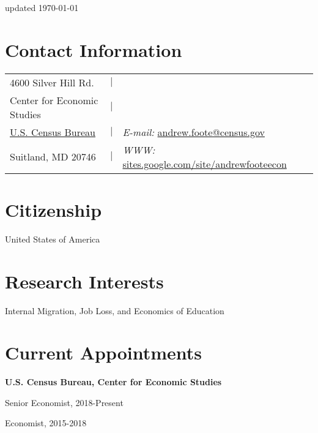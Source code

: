 \documentclass[margin,line]{res}
\newenvironment{list1}{
  \begin{list}{\ding{113}}{%
      \setlength{\itemsep}{0in}
      \setlength{\parsep}{0in} \setlength{\parskip}{0in}
      \setlength{\topsep}{0in} \setlength{\partopsep}{0in} 
      \setlength{\leftmargin}{0.17in}}}{\end{list}}
\begin{document}
{}

 \hfill updated \today{}

\begin{resume}
\section{\sc Contact Information}
\vspace{.02in}
\begin{tabular}{@{}p{2in}p{1.5in}p{4in}}
4600 Silver Hill Rd.             &\hfill $\vert$ &\\            
{Center for Economic Studies} &\hfill $\vert$   &\\    
\href{http://www.census.gov/}{U.S. Census Bureau} &\hfill $\vert$ & {\it E-mail:}  \href{mailto:andrew.foote@census.gov}{andrew.foote@census.gov}\\       
Suitland, MD 20746  &\hfill $\vert$& {\it WWW:} \href{http://sites.google.com/site/andrewfooteecon}{sites.google.com/site/andrewfooteecon} \\     
\end{tabular}

\section{\sc Citizenship} 

United States of America

\vspace{-.1in}
\section{\sc Research Interests}
Internal Migration, Job Loss, and Economics of Education

\section{\sc Current Appointments}

{\bf U.S. Census Bureau, Center for Economic Studies}
\begin{list1}
\item[] Senior Economist, 2018-Present
\item[] Economist, 2015-2018
\end{list1}


\end{resume}
\end{document}
